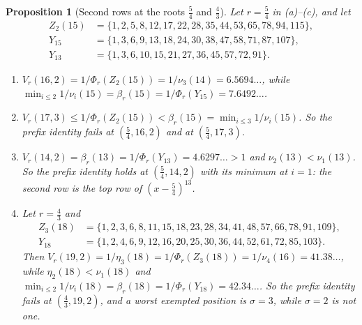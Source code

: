 \documentclass[11pt]{article}
\newtheorem{proposition}[theorem]{Proposition}
\begin{document}
\begin{proposition}[Second rows at the roots $\frac54$ and $\frac43$]\label{prop:secondrowexact}
Let $r=\frac54$ in (a)--(c), and let
\begin{align*}
  Z_2(15)&=\{1,2,5,8,12,17,22,28,35,44,53,65,78,94,115\},\\
  Y_{15}&=\{1,3,6,9,13,18,24,30,38,47,58,71,87,107\},\\
  Y_{13}&=\{1,3,6,10,15,21,27,36,45,57,72,91\}.
\end{align*}
\begin{enumerate}
\item[(a)] $V_r(16,2)=1/\Phi_r(Z_2(15))=1/\nu_3(14)=6.5694\ldots$, while
$\min_{i\le2}1/\nu_i(15)=\beta_r(15)=1/\Phi_r(Y_{15})=7.6492\ldots$.
\item[(b)] $V_r(17,3)\le1/\Phi_r(Z_2(15))<\beta_r(15)=\min_{i\le3}1/\nu_i(15)$.
So the prefix identity fails at $(\frac54,16,2)$ and at $(\frac54,17,3)$.
\item[(c)] $V_r(14,2)=\beta_r(13)=1/\Phi_r(Y_{13})=4.6297\ldots>1$ and
$\nu_2(13)<\nu_1(13)$.  So the prefix identity holds at $(\frac54,14,2)$
with its minimum at $i=1$: the second row is the top row of
$(x-\frac54)^{13}$.
\item[(d)] Let $r=\frac43$ and
\begin{align*}
Z_3(18)&=\{1,2,3,6,8,11,15,18,23,28,34,41,48,57,66,78,91,109\},\\
Y_{18}&=\{1,2,4,6,9,12,16,20,25,30,36,44,52,61,72,85,103\}.
\end{align*}
Then
$V_r(19,2)=1/\eta_3(18)=1/\Phi_r(Z_3(18))=1/\nu_4(16)=41.38\ldots$, while
$\eta_2(18)<\nu_1(18)$ and
$\min_{i\le2}1/\nu_i(18)=\beta_r(18)=1/\Phi_r(Y_{18})=42.34\ldots$.  So the
prefix identity fails at $(\frac43,19,2)$, and a worst exempted position
is $\sigma=3$, while $\sigma=2$ is not one.
\end{enumerate}
\end{proposition}
\end{document}
